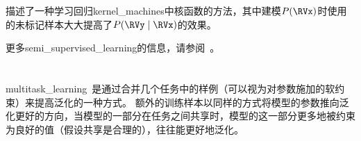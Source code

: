\cite{Salakhutdinov-Hinton-2008}描述了一种学习回归\gls{kernel_machines}中核函数的方法，其中建模$P(\RVx)$时使用的未标记样本大大提高了$P(\RVy \mid \RVx)$的效果。

更多\gls{semi_supervised_learning}的信息，请参阅~\cite{Chapelle-et-al-2006}。

\section{}
\label{sec:multitask_learning}
\gls{multitask_learning}~\citep{Caruana-1993}是通过合并几个任务中的样例（可以视为对参数施加的软约束）来提高泛化的一种方式。
额外的训练样本以同样的方式将模型的参数推向泛化更好的方向，当模型的一部分在任务之间共享时，模型的这一部分更多地被约束为良好的值（假设共享是合理的），往往能更好地泛化。

